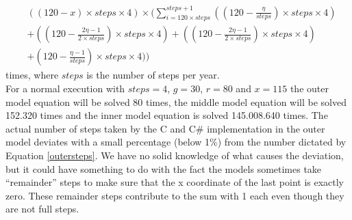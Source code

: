 	\begin{align}
 \nonumber&((120-x) \times steps \times 4) \times  
	(\sum\limits_{i=120 \times steps}^{steps+1} 
	( 
	(120 - \frac{\eta}{steps}) \times steps \times 4) \\ \nonumber & + 
	((120 - \frac{2\eta - 1}{2 \times steps})\times steps \times 4) + 
	((120 - \frac{2\eta - 1}{2 \times steps})\times steps \times 4) \\& +
	(120 - \frac{\eta-1}{steps}) \times steps \times 4)
	)
	\label{outersteps}
	\end{align} times, where $steps$ is the number of steps per year.\\
	
	For a normal execution with $steps=4$, $g=30$, $r=80$ and $x=115$ the outer model equation will be solved 80 times, the middle model equation will be solved 152.320 times and the inner model equation is solved 145.008.640 times. The actual number of steps taken by the C and C\# implementation in the outer model deviates with a small percentage (below 1\%) from the number dictated by Equation \ref{outersteps}. We have no solid knowledge of what causes the deviation, but it could have something to do with the fact the models sometimes take ``remainder'' steps to make sure that the x coordinate of the last point is exactly zero. These remainder steps contribute to the sum with 1 each even though they are not full steps.
